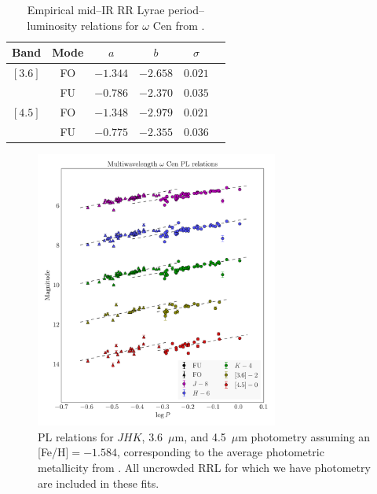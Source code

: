 \documentclass[a4paper,fleqn,usenatbib]{mnras}
\begin{document}
\begin{table}
\centering
\caption{Empirical mid--IR RR Lyrae period--luminosity relations for $\omega$ Cen from \citet{2015arXiv150507858N}.} 
\label{tab:pl_table_m4}
\begin{tabular}{l||c|c|c|c|r} 
\hline \hline
Band & Mode & $a$   & $b$  & $\sigma$ \\
\hline
$[3.6]$ & FO & $-1.344$ & $-2.658$ & $0.021$ \\
            & FU & $-0.786$ & $-2.370$ & $0.035$ \\
$[4.5]$ & FO & $-1.348$ & $-2.979$ & $0.021$ \\         
            & FU & $-0.775$ & $-2.355$ & $0.036$ \\
            \hline
\end{tabular}
\end{table}

\begin{figure}
\begin{center}
\includegraphics[width=80mm]{final_plots/multiwavelength_PL_allstars_phot.pdf}
\caption{PL relations for $J\!H\!K$, 3.6~$\mu$m, and 4.5~$\mu$m photometry assuming an [Fe/H]$=-1.584$, corresponding to the average photometric metallicity from \citet{2000AJ....119.1824R}. All uncrowded RRL for which we have photometry are included in these fits.}
\label{fig:omegaCen_pl_allstars}
\end{center}
\end{figure}
\end{document}
